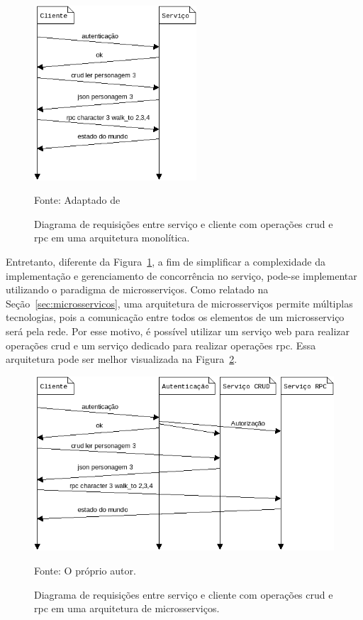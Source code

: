 \begin{figure}[htb!]
\caption{Diagrama de requisições entre serviço e cliente com operações \ac{crud} e \ac{rpc} em uma arquitetura monolítica.}
\label{fig:network_crud_rpc}
\includegraphics[height=6.5cm]{img/cap2/network_rpc_crud.png}
\centering

Fonte: Adaptado de~\cite{LeckyThompson2008Nov}
\end{figure}

Entretanto, diferente da Figura~\ref{fig:network_crud_rpc}, a fim de simplificar a complexidade da implementação e gerenciamento de concorrência no serviço, pode-se implementar utilizando o paradigma de microsserviços.
%
Como relatado na Seção~\ref{sec:microsservicos}, uma arquitetura de microsserviços permite múltiplas tecnologias, pois a comunicação entre todos os elementos de um microsserviço será pela rede.
%
Por esse motivo, é possível utilizar um serviço web para realizar operações \ac{crud} e um serviço dedicado para realizar operações \ac{rpc}.
%
Essa arquitetura pode ser melhor visualizada na Figura~\ref{fig:network_crud_rpc_micro}.

\begin{figure}[htb!]
\caption{Diagrama de requisições entre serviço e cliente com operações \ac{crud} e \ac{rpc} em uma arquitetura de microsserviços.}
\label{fig:network_crud_rpc_micro}
\includegraphics[height=6.5cm]{img/cap2/network_rpc_crud_micro.png}
\centering

Fonte: O próprio autor.
\end{figure}



